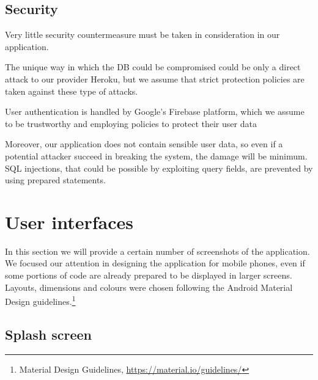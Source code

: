 \documentclass[a4paper]{scrreprt}
\begin{document}
\section{Security}
Very little security countermeasure must be taken in consideration in our application.
\par The unique way in which the DB could be compromised could be only a direct attack to our provider Heroku, but we assume that strict protection policies are taken against these type of attacks.
\par User authentication is handled by Google's Firebase platform, which we assume to be trustworthy and employing policies to protect their user data
\par Moreover, our application does not contain sensible user data, so even if a potential attacker succeed in breaking the system, the damage will be minimum. SQL injections, that could be possible by exploiting query fields, are prevented by using prepared statements.



\chapter{User interfaces}
In this section we will provide a certain number of screenshots of the application. We focused our attention in designing the application for mobile phones, even if some portions of code are already prepared to be displayed in larger screens. Layouts, dimensions and colours were chosen following the Android Material Design guidelines.\footnote{Material Design Guidelines, \url{https://material.io/guidelines/}}

\section{Splash screen}
\end{document}

